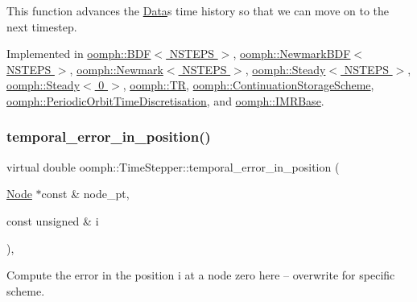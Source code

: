 This function advances the \hyperlink{classoomph_1_1Data}{Data}\textquotesingle{}s time history so that we can move on to the next timestep. 



Implemented in \hyperlink{classoomph_1_1BDF_a037ce83f202e4ba2e61666bfdb1ce4b9}{oomph\+::\+B\+D\+F$<$ N\+S\+T\+E\+P\+S $>$}, \hyperlink{classoomph_1_1NewmarkBDF_a4726c0ea901167bc2124c63bf6e5f692}{oomph\+::\+Newmark\+B\+D\+F$<$ N\+S\+T\+E\+P\+S $>$}, \hyperlink{classoomph_1_1Newmark_a3f8606d569f947669006b9b079ac4c82}{oomph\+::\+Newmark$<$ N\+S\+T\+E\+P\+S $>$}, \hyperlink{classoomph_1_1Steady_aa1c00b0014a2394f7b2e1b302ebbce00}{oomph\+::\+Steady$<$ N\+S\+T\+E\+P\+S $>$}, \hyperlink{classoomph_1_1Steady_aa1c00b0014a2394f7b2e1b302ebbce00}{oomph\+::\+Steady$<$ 0 $>$}, \hyperlink{classoomph_1_1TR_a4f8cc75e39263619c073076ae5bbab36}{oomph\+::\+TR}, \hyperlink{classoomph_1_1ContinuationStorageScheme_a74f8d1b2ca6413edfa6fe4a5110a215f}{oomph\+::\+Continuation\+Storage\+Scheme}, \hyperlink{classoomph_1_1PeriodicOrbitTimeDiscretisation_a6893d2c1436831d5ad635b43bd91f42e}{oomph\+::\+Periodic\+Orbit\+Time\+Discretisation}, and \hyperlink{classoomph_1_1IMRBase_a34c72011189de014a69288fbcfac54f4}{oomph\+::\+I\+M\+R\+Base}.

\mbox{\label{classoomph_1_1TimeStepper_ac463807aff4bcbedd6e8a463c7390536}} 
\subsubsection{\texorpdfstring{temporal\+\_\+error\+\_\+in\+\_\+position()}{temporal\_error\_in\_position()}}
{\footnotesize\ttfamily virtual double oomph\+::\+Time\+Stepper\+::temporal\+\_\+error\+\_\+in\+\_\+position (\begin{DoxyParamCaption}\item[{\hyperlink{classoomph_1_1Node}{Node} $\ast$const \&}]{node\+\_\+pt,  }\item[{const unsigned \&}]{i }\end{DoxyParamCaption})\hspace{0.3cm}{\ttfamily [inline]}, {\ttfamily [virtual]}}

Compute the error in the position i at a node zero here -- overwrite for specific scheme. 

